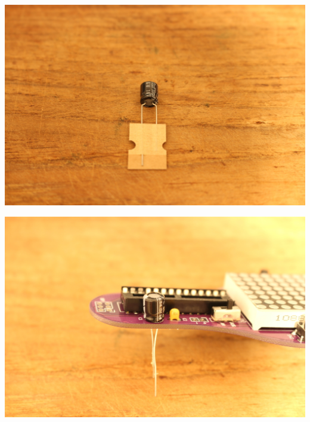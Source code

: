 \documentclass{article}
\begin{document}
\begin{minipage}[b]{0.5\textwidth}
	\includegraphics[width=\textwidth]{Bilder2024/IMG_0070.JPG}
\end{minipage}
\begin{minipage}[b]{0.5\textwidth}
	\includegraphics[width=\textwidth]{Bilder2024/IMG_0071.JPG}
\end{minipage}

\vspace{0.5cm}
\end{document}
